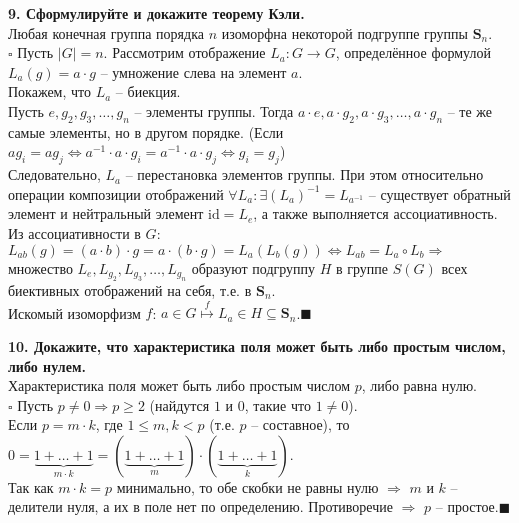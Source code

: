 \documentclass[11pt,a4paper]{article}
\newcommand{\proof}{$\square$ }
\newcommand{\qed}{\hfill$\blacksquare$}
\begin{document}
\textbf{9. Сформулируйте и докажите теорему Кэли.\\}
Любая конечная группа порядка $n$ изоморфна некоторой подгруппе группы $\mathbf{S}_n$.\\
\proof Пусть $|G| = n$. Рассмотрим отображение $L_a: G \rightarrow G$, определённое формулой $L_a(g) = a \cdot g$ -- умножение слева на элемент $a$.\\
Покажем, что $L_a$ -- биекция.\\
Пусть $e, g_2, g_3, \hdots, g_n$ -- элементы группы. Тогда $a \cdot e, a \cdot g_2, a \cdot g_3, \hdots, a \cdot g_n$ -- те же самые элементы, но в другом порядке. (Если $a g_i = a g_j \Leftrightarrow a^{-1} \cdot a \cdot g_i = a^{-1} \cdot a \cdot g_j \Leftrightarrow g_i = g_j$)\\
Следовательно, $L_a$ -- перестановка элементов группы. При этом относительно операции композиции отображений $\forall L_a: \exists (L_a)^{-1} = L_{a^{-1}}$ -- существует обратный элемент и нейтральный элемент $\mathrm{id} = L_e$, а также выполняется ассоциативность.\\
Из ассоциативности в $G$: $L_{ab}(g) = (a \cdot b) \cdot g = a \cdot (b \cdot g) = L_a\left(L_b(g)\right) \Leftrightarrow L_{ab} = L_a \circ L_b \Rightarrow$ множество $L_e, L_{g_2}, L_{g_3}, \hdots, L_{g_n}$ образуют подгруппу $H$ в группе $S(G)$ всех биективных отображений на себя, т.е. в $\mathbf{S}_n$.\\
Искомый изоморфизм $f$: $a \in G \stackrel{f}{\mapsto} L_a \in H \subseteq \mathbf{S}_n$.\qed

\textbf{10. Докажите, что характеристика поля может быть либо простым числом, либо нулем.\\}
Характеристика поля может быть либо простым числом $p$, либо равна нулю.\\
\proof Пусть $p \neq 0 \Rightarrow p \geq 2$ (найдутся $1$ и $0$, такие что $1 \neq 0$).\\
Если $p = m \cdot k$, где $1 \leq m, k < p$ (т.е. $p$ -- составное), то $0 = \underbrace{1 + \hdots + 1}_{m \cdot k} = (\underbrace{1 + \hdots + 1}_m) \cdot (\underbrace{1 + \hdots + 1}_{k})$.\\
Так как $m \cdot k = p$ минимально, то обе скобки не равны нулю $\Rightarrow$ $m$ и $k$ -- делители нуля, а их в поле нет по определению. Противоречие $\Rightarrow$ $p$ -- простое.\qed
\end{document}

